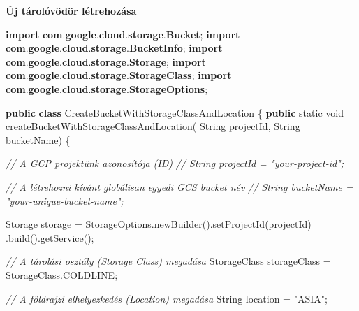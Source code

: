 \documentclass[
]{article}
\newenvironment{Shaded}{}{}
\newcommand{\BuiltInTok}[1]{\textcolor[rgb]{0.00,0.50,0.00}{#1}}
\newcommand{\CommentTok}[1]{\textcolor[rgb]{0.38,0.63,0.69}{\textit{#1}}}
\newcommand{\DataTypeTok}[1]{\textcolor[rgb]{0.56,0.13,0.00}{#1}}
\newcommand{\FunctionTok}[1]{\textcolor[rgb]{0.02,0.16,0.49}{#1}}
\newcommand{\ImportTok}[1]{\textcolor[rgb]{0.00,0.50,0.00}{\textbf{#1}}}
\newcommand{\KeywordTok}[1]{\textcolor[rgb]{0.00,0.44,0.13}{\textbf{#1}}}
\newcommand{\NormalTok}[1]{#1}
\newcommand{\OperatorTok}[1]{\textcolor[rgb]{0.40,0.40,0.40}{#1}}
\newcommand{\StringTok}[1]{\textcolor[rgb]{0.25,0.44,0.63}{#1}}
\begin{document}
\textbf{Új tárolóvödör létrehozása}

\begin{Shaded}
\begin{Highlighting}[]
\KeywordTok{import} \ImportTok{com}\OperatorTok{.}\ImportTok{google}\OperatorTok{.}\ImportTok{cloud}\OperatorTok{.}\ImportTok{storage}\OperatorTok{.}\ImportTok{Bucket}\OperatorTok{;}
\KeywordTok{import} \ImportTok{com}\OperatorTok{.}\ImportTok{google}\OperatorTok{.}\ImportTok{cloud}\OperatorTok{.}\ImportTok{storage}\OperatorTok{.}\ImportTok{BucketInfo}\OperatorTok{;}
\KeywordTok{import} \ImportTok{com}\OperatorTok{.}\ImportTok{google}\OperatorTok{.}\ImportTok{cloud}\OperatorTok{.}\ImportTok{storage}\OperatorTok{.}\ImportTok{Storage}\OperatorTok{;}
\KeywordTok{import} \ImportTok{com}\OperatorTok{.}\ImportTok{google}\OperatorTok{.}\ImportTok{cloud}\OperatorTok{.}\ImportTok{storage}\OperatorTok{.}\ImportTok{StorageClass}\OperatorTok{;}
\KeywordTok{import} \ImportTok{com}\OperatorTok{.}\ImportTok{google}\OperatorTok{.}\ImportTok{cloud}\OperatorTok{.}\ImportTok{storage}\OperatorTok{.}\ImportTok{StorageOptions}\OperatorTok{;}

\KeywordTok{public} \KeywordTok{class}\NormalTok{ CreateBucketWithStorageClassAndLocation }\OperatorTok{\{}
  \KeywordTok{public} \DataTypeTok{static} \DataTypeTok{void} \FunctionTok{createBucketWithStorageClassAndLocation}\OperatorTok{(}
            \BuiltInTok{String}\NormalTok{ projectId}\OperatorTok{,} \BuiltInTok{String}\NormalTok{ bucketName}\OperatorTok{)} \OperatorTok{\{}
    
    \CommentTok{// A GCP projektünk azonosítója (ID)}
    \CommentTok{// String projectId = "your{-}project{-}id";}

    \CommentTok{// A létrehozni kívánt globálisan egyedi GCS bucket név}
    \CommentTok{// String bucketName = "your{-}unique{-}bucket{-}name";}

\NormalTok{    Storage storage }\OperatorTok{=}\NormalTok{ StorageOptions}\OperatorTok{.}\FunctionTok{newBuilder}\OperatorTok{().}\FunctionTok{setProjectId}\OperatorTok{(}\NormalTok{projectId}\OperatorTok{)}
            \OperatorTok{.}\FunctionTok{build}\OperatorTok{().}\FunctionTok{getService}\OperatorTok{();}

    \CommentTok{// A tárolási osztály (Storage Class) megadása}
\NormalTok{    StorageClass storageClass }\OperatorTok{=}\NormalTok{ StorageClass}\OperatorTok{.}\FunctionTok{COLDLINE}\OperatorTok{;}

    \CommentTok{// A földrajzi elhelyezkedés (Location) megadása}
    \BuiltInTok{String}\NormalTok{ location }\OperatorTok{=} \StringTok{"ASIA"}\OperatorTok{;}


\end{Highlighting}
\end{Shaded}
\end{document}

